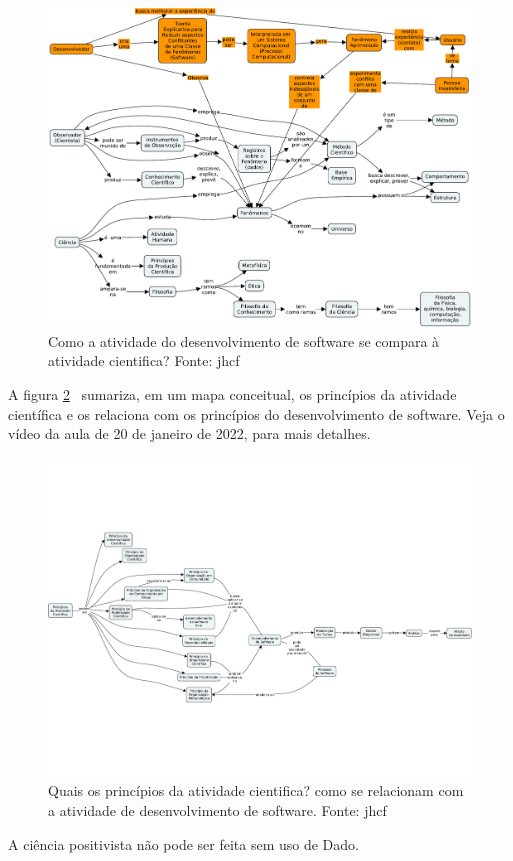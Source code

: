 \begin{figure}
    \centering
    \includegraphics[page=1,angle=90,width=1\textwidth]{1-Introducao/aulas/Desenvolvimento-de-Software-Ciencia-e-Filosofia.pdf}
    \caption{Como a atividade do desenvolvimento de software se compara à atividade cientifica? Fonte: jhcf}
    \label{fig:desenv-sw-ciencia-filosofia}
\end{figure}

A figura \ref{fig:principios:ativ:cientifica}~ sumariza, em um mapa conceitual, os princípios da atividade científica e os relaciona com os princípios do desenvolvimento de software.
Veja o vídeo da aula de 20 de janeiro de 2022, para mais detalhes.

\begin{figure}
    \centering
    \includegraphics[page=1,angle=90,width=1\textwidth]{1-Introducao/aulas/Principios-da-atividade-cientifica.pdf}
    \caption{Quais os princípios da  atividade cientifica? como se relacionam com a atividade de desenvolvimento de software. Fonte: jhcf}
    \label{fig:principios:ativ:cientifica}
\end{figure}

A ciência positivista não pode ser feita sem uso de \gls{Dado}. 
